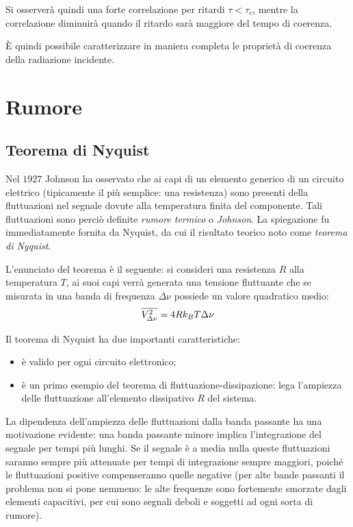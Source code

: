 Si osserverà quindi una forte correlazione per ritardi $ \tau < \tau_c $, mentre la correlazione diminuirà quando il ritardo sarà maggiore del tempo di coerenza.

\`E quindi possibile caratterizzare in maniera completa le proprietà di coerenza della radiazione incidente.

\section{Rumore}

\subsection{Teorema di Nyquist}
\label{sec:nyquistth}

Nel $ 1927 $ Johnson ha osservato che ai capi di un elemento generico di un circuito elettrico (tipicamente il più semplice: una resistenza) sono presenti della fluttuazioni nel segnale dovute alla temperatura finita del componente. Tali fluttuazioni sono perciò definite \textit{rumore termico} o \textit{Johnson}.
La spiegazione fu immediatamente fornita da Nyquist, da cui il risultato teorico noto come \textit{teorema di Nyquist}.
\newline

L'enunciato del teorema è il seguente: si consideri una resistenza $ R $ alla temperatura $ T $, ai suoi capi verrà generata una tensione fluttuante che se misurata in una banda di frequenza $ \Delta \nu $ possiede un valore quadratico medio:
\[ \overline{V_{\Delta \nu}^2} = 4 R k_B T \Delta \nu \]

Il teorema di Nyquist ha due importanti caratteristiche:
\begin{itemize}
	\item è valido per ogni circuito elettronico;
	\item è un primo esempio del teorema di fluttuazione-dissipazione: lega l'ampiezza delle fluttuazione all'elemento dissipativo $ R $ del sistema.
\end{itemize}

\begin{oss}
	La dipendenza dell'ampiezza delle fluttuazioni dalla banda passante ha una motivazione evidente: una banda passante minore implica l'integrazione del segnale per tempi più lunghi. Se il segnale è a media nulla queste fluttuazioni saranno sempre più attenuate per tempi di integrazione sempre maggiori, poiché le fluttuazioni positive compenseranno quelle negative (per alte bande passanti il problema non si pone nemmeno: le alte frequenze sono fortemente smorzate dagli elementi capacitivi, per cui sono segnali deboli e soggetti ad ogni sorta di rumore).
\end{oss}

